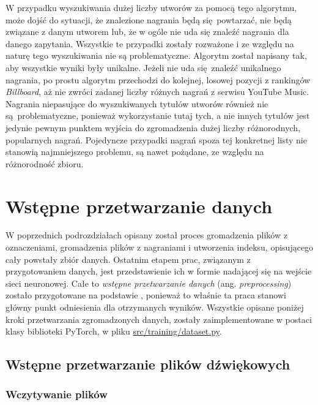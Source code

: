 W przypadku wyszukiwania dużej liczby utworów za pomocą tego algorytmu, może dojść do sytuacji, że znalezione nagrania będą się powtarzać, nie będą związane z danym utworem lub, że w ogóle nie uda się znaleźć nagrania dla danego zapytania. Wszystkie te przypadki zostały rozważone i ze względu na naturę tego wyszukiwania nie są problematyczne. Algorytm został napisany tak, aby wszystkie wyniki były unikalne. Jeżeli nie uda się znaleźć unikalnego nagrania, po prostu algorytm przechodzi do kolejnej, losowej pozycji z rankingów \emph{Billboard}, aż nie zwróci zadanej liczby różnych nagrań z serwisu YouTube Music. Nagrania niepasujące do wyszukiwanych tytułów utworów również nie są problematyczne, ponieważ wykorzystanie tutaj tych, a nie innych tytułów jest jedynie pewnym punktem wyjścia do zgromadzenia dużej liczby różnorodnych, popularnych nagrań. Pojedyncze przypadki nagrań spoza tej konkretnej listy nie stanowią najmniejszego problemu, są nawet pożądane, ze względu na różnorodność zbioru.

\section{Wstępne przetwarzanie danych} \label{sec:preprocessing}

W poprzednich podrozdziałach opisany został proces gromadzenia plików z oznaczeniami, gromadzenia plików z nagraniami i utworzenia indeksu, opisującego cały powstały zbiór danych. Ostatnim etapem prac, związanym z przygotowaniem danych, jest przedstawienie ich w formie nadającej się na wejście sieci neuronowej. Całe to \emph{wstępne przetwarzanie danych} (ang. \emph{preprocessing}) zostało przygotowane na podstawie \cite{park_bi-directional_2019}, ponieważ to właśnie ta praca stanowi główny punkt odniesienia dla otrzymanych wyników. Wszystkie opisane poniżej kroki przetwarzania zgromadzonych danych, zostały zaimplementowane w postaci klasy  biblioteki PyTorch, w pliku \url{src/training/dataset.py}.

\subsection{Wstępne przetwarzanie plików dźwiękowych}

\subsubsection{Wczytywanie plików}


